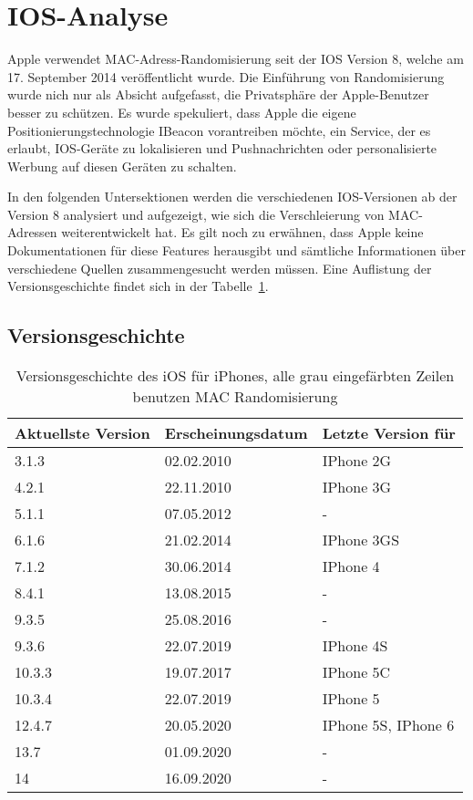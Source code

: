 \cleardoublepage

\section{IOS-Analyse
\label{section:iosanalysis}}
Apple verwendet MAC-Adress-Randomisierung seit der IOS Version 8, 
welche am 17. September 2014 veröffentlicht wurde.
Die Einführung von Randomisierung wurde nich nur als Absicht aufgefasst,
die Privatsphäre der Apple-Benutzer besser zu schützen. 
Es wurde spekuliert, dass Apple die eigene Positionierungstechnologie
IBeacon vorantreiben möchte, ein Service, der es erlaubt, IOS-Geräte 
zu lokalisieren und Pushnachrichten oder personalisierte Werbung auf diesen 
Geräten zu schalten.

In den folgenden Untersektionen werden die verschiedenen IOS-Versionen ab der
Version 8 analysiert und aufgezeigt, wie sich die Verschleierung von 
MAC-Adressen weiterentwickelt hat.
Es gilt noch zu erwähnen, dass Apple keine Dokumentationen für diese Features
herausgibt und sämtliche Informationen über verschiedene Quellen zusammengesucht 
werden müssen.
Eine Auflistung der Versionsgeschichte findet sich in der 
Tabelle~\ref{table:iosversionhistory}.

\subsection{Versionsgeschichte}
\begin{table}[H]
    \begin{tabularx}{\linewidth}{XXX}
        \toprule 
        \textbf{Aktuellste Version} & \textbf{Erscheinungsdatum} & \textbf{Letzte Version für} \\
        \midrule
        3.1.3 & 02.02.2010 & IPhone 2G \\
        4.2.1 & 22.11.2010 & IPhone 3G \\
        5.1.1 & 07.05.2012 & - \\
        6.1.6 & 21.02.2014 & IPhone 3GS \\
        7.1.2 & 30.06.2014 & IPhone 4 \\
        \rowcolor{lightgray}
        8.4.1 & 13.08.2015 & - \\
        \rowcolor{lightgray}
        9.3.5 & 25.08.2016 & - \\
        \rowcolor{lightgray}
        9.3.6 & 22.07.2019 & IPhone 4S \\
        \rowcolor{lightgray}
        10.3.3 & 19.07.2017 & IPhone 5C \\
        \rowcolor{lightgray}
        10.3.4 & 22.07.2019 & IPhone 5 \\
        \rowcolor{lightgray}
        12.4.7 & 20.05.2020 & IPhone 5S, IPhone 6 \\
        \rowcolor{lightgray}
        13.7 & 01.09.2020 & - \\
        \rowcolor{lightgray}
        14 & 16.09.2020 & - \\
        \bottomrule 
    \end{tabularx}
    \caption{Versionsgeschichte des iOS für iPhones, 
    alle grau eingefärbten Zeilen benutzen MAC Randomisierung
    \label{table:iosversionhistory}}
\end{table}

